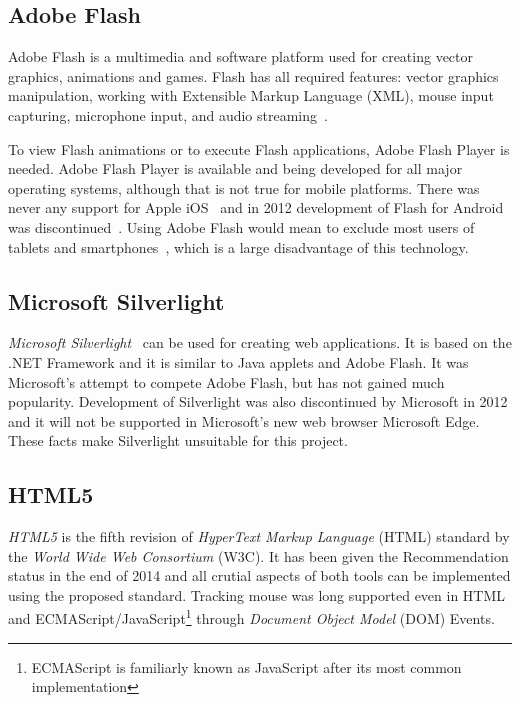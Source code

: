 \subsection{Adobe Flash}
Adobe Flash is a multimedia and software platform used for creating vector graphics, animations and games. Flash has all required features: vector graphics manipulation, working with Extensible Markup Language (XML), mouse input capturing, microphone input, and audio streaming~\cite{flash}. 

To view Flash animations or to execute Flash applications, Adobe Flash Player is needed. Adobe Flash Player is available and being developed for all major operating systems, although that is not true for mobile platforms. There was never any support for Apple iOS~\cite{steve_jobs} and in 2012 development of Flash for Android was discontinued~\cite{adobe_mobile}. Using Adobe Flash would mean to exclude most users of tablets and smartphones~\cite{mobile_statistics}, which is a large disadvantage of this technology.

\subsection{Microsoft Silverlight}
\textit{Microsoft Silverlight}~\cite{silverlight} can be used for creating web applications. It is based on the .NET Framework and it is similar to Java applets and Adobe Flash. It was Microsoft's attempt to compete Adobe Flash, but has not gained much popularity. Development of Silverlight was also discontinued by Microsoft in 2012 and it will not be supported in Microsoft's new web browser Microsoft Edge\cite{silverlight_is_dead}. These facts make Silverlight unsuitable for this project.


\subsection{HTML5}
\textit{HTML5} is the fifth revision of \textit{HyperText Markup Language} (HTML) standard by the \textit{World Wide Web Consortium} (W3C). It has been given the Recommendation status in the end of 2014 and all crutial aspects of both tools can be implemented using the proposed standard. Tracking mouse was long supported even in HTML and ECMAScript/JavaScript\footnote{ECMAScript is familiarly known as JavaScript after its most common implementation\cite{javascript_vs_ecmascript}} through \textit{Document Object Model} (DOM) Events\cite{dom_mouse_events}.

